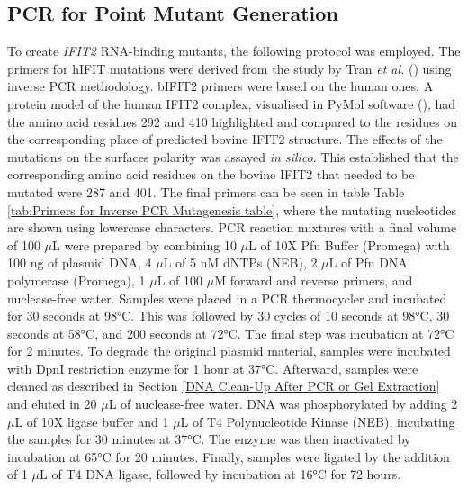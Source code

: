 \subsection{PCR for Point Mutant Generation} \label{subsec:PCR for Point Mutant Generation}
To create \textit{IFIT2} RNA-binding mutants, the following protocol was employed. The primers for hIFIT mutations were derived from the study by Tran \textit{et al.} (\cite{Tran2020InfluenzaMRNAs}) using inverse PCR methodology. bIFIT2 primers were based on the human ones. A protein model of the human IFIT2 complex, visualised in PyMol software (\cite{SchrodingerTeam2023TheSystem}), had the amino acid residues 292 and 410 highlighted and compared to the residues on the corresponding place of predicted bovine IFIT2 structure. The effects of the mutations on the surfaces polarity was assayed \textit{in silico}. This established that the corresponding amino acid residues on the bovine IFIT2 that needed to be mutated were 287 and 401. The final primers can be seen in table Table \ref{tab:Primers for Inverse PCR Mutagenesis table}, where the mutating nucleotides are shown using lowercase characters. PCR reaction mixtures with a final volume of 100 \(\mu\)L were prepared by combining 10 \(\mu\)L of 10X Pfu Buffer (Promega) with 100 ng of plasmid DNA, 4 \(\mu\)L of 5 nM dNTPs (NEB), 2 \(\mu\)L of Pfu DNA polymerase (Promega), 1 \(\mu\)L of 100 \(\mu\)M forward and reverse primers, and nuclease-free water. Samples were placed in a PCR thermocycler and incubated for 30 seconds at 98°C. This was followed by 30 cycles of 10 seconds at 98°C, 30 seconds at 58°C, and 200 seconds at 72°C. The final step was incubation at 72°C for 2 minutes. To degrade the original plasmid material, samples were incubated with DpnI restriction enzyme for 1 hour at 37°C. Afterward, samples were cleaned as described in Section \ref{DNA Clean-Up After PCR or Gel Extraction} and eluted in 20 \(\mu\)L of nuclease-free water. DNA was phosphorylated by adding 2 \(\mu\)L of 10X ligase buffer and 1 \(\mu\)L of T4 Polynucleotide Kinase (NEB), incubating the samples for 30 minutes at 37°C. The enzyme was then inactivated by incubation at 65°C for 20 minutes. Finally, samples were ligated by the addition of 1 \(\mu\)L of T4 DNA ligase, followed by incubation at 16°C for 72 hours.

